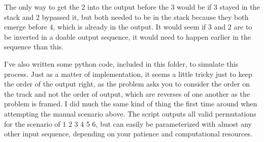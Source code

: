 \documentclass{article}
\begin{document}
The only way to get the 2 into the output before the 3 would be if 3 stayed in the stack and 2 bypassed it, but both needed to be in the stack because they both emerge before 4, which is already in the output.  It would seem if 3 and 2 are to be inverted in a doable output sequence, it would need to happen earlier in the sequence than this.

\par

I've also written some python code, included in this folder, to simulate this process. Just as a matter of implementation, it seems a little tricky just to keep the order of the output right, as the problem asks you to consider the order on the track and not the order of output, which are reverses of one another as the problem is framed.  I did much the same kind of thing the first time around when attempting the manual scenario above.  The script outputs all valid permutations for the scenario of 1 2 3 4 5 6, but can easily be parameterized with almost any other input sequence, depending on your patience and computational resources.
\end{document}
